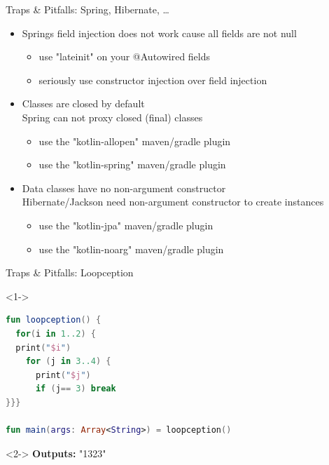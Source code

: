 \begin{frame}{Traps \& Pitfalls: Spring, Hibernate, \dots}
	\begin{itemize}
		\item Springs field injection does not work cause all fields are not null
		\begin{itemize}
			\item use "lateinit" on your @Autowired fields
			\item seriously use constructor injection over field injection
		\end{itemize}
		\item Classes are closed by default\\
		Spring can not proxy closed (final) classes
		\begin{itemize}
			\item use the "kotlin-allopen" maven/gradle plugin
			\item use the "kotlin-spring" maven/gradle plugin
		\end{itemize}
		\item Data classes have no non-argument constructor\\
		Hibernate/Jackson need non-argument constructor to create instances
		\begin{itemize}
			\item use the "kotlin-jpa" maven/gradle plugin
			\item use the "kotlin-noarg" maven/gradle plugin
		\end{itemize}
	\end{itemize}
\end{frame}

\begin{frame}[fragile]{Traps \& Pitfalls: Loopception}
	\begin{overlayarea}{\textwidth}{\textheight}
		\begin{onlyenv}<1->
\begin{lstlisting}[language=Kotlin]
fun loopception() {
  for(i in 1..2) {
  print("$i")
    for (j in 3..4) {
      print("$j")
      if (j== 3) break
}}}

fun main(args: Array<String>) = loopception()
\end{lstlisting}
		\end{onlyenv}
		\begin{onlyenv}<2->
			\textbf{Outputs:} "1323"
		\end{onlyenv}
	\end{overlayarea}
\end{frame}

